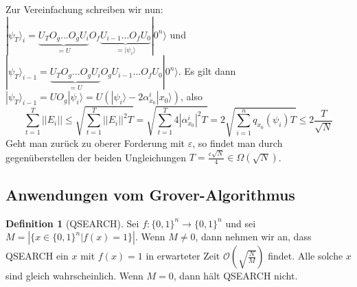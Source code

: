 \documentclass[a4paper, 12pt]{article}
\theoremstyle{plain}
\theoremstyle{definition}
\newtheorem{definition}[theorem]{Definition} %
\theoremstyle{lemma}
\theoremstyle{remark}
\theoremstyle{example}
\begin{document}
	Zur Vereinfachung schreiben wir nun:\\
	$|\psi_T\rangle_i = \underbrace{U_TO_g ... O_gU_i}_{= U} O_f\underbrace{U_{i-1} ... O_fU_0}_{=|\psi_i\rangle}|0^n\rangle$ und \\
	$|\psi_T\rangle_{i-1} = \underbrace{U_TO_g ... O_gU_i}_{= U} O_gU_{i-1} ... O_fU_0|0^n\rangle$. Es gilt dann $|\psi_T\rangle_{i-1} = UO_g|\psi_i\rangle = U(|\psi_i\rangle - 2\alpha_{x_0}^i |x_0\rangle)$, also \[\sum_{t=1}^T ||E_i|| \leq \sqrt{\sum_{t=1}^T ||E_i||^2 T} = \sqrt{\sum_{t=1}^T 4|\alpha_{x_0}^i|^2 T} = 2\sqrt{\sum_{i=1}^n q_{x_0}(\psi_i) T} \leq 2\frac{T}{\sqrt{N}}\]
	Geht man zurück zu oberer Forderung mit $\varepsilon$, so findet man durch gegenüberstellen der beiden Ungleichungen $T = \frac{\varepsilon\sqrt{N}}{4} \in \Omega(\sqrt{N})$.
	\subsection{Anwendungen vom Grover-Algorithmus}
	\begin{definition}[QSEARCH]
		Sei $f:\{0,1\}^n \to \{0,1\}^n$ und sei $M = \left|\{x\in \{0,1\}^n| f(x) = 1\}\right|$. Wenn $M\neq 0$, dann nehmen wir an, dass QSEARCH ein $x$ mit $f(x) = 1$ in erwarteter Zeit $\mathcal{O}(\sqrt{\frac{N}{M}})$ findet. Alle solche $x$ sind gleich wahrscheinlich. Wenn $M = 0$, dann hält QSEARCH nicht.
	\end{definition}
\end{document}
